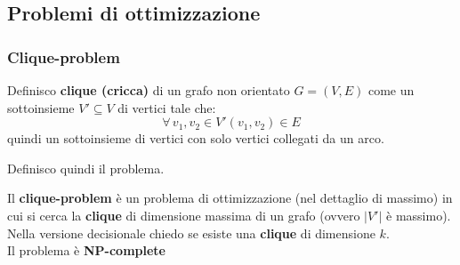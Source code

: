 																				
										\subsection{Problemi di ottimizzazione}
										\subsubsection{Clique-problem}
										\begin{definizione}
											Definisco \textbf{clique (\textup{cricca})} di un grafo non orientato
											$G=(V,E)$ come un sottoinsieme $V'\subseteq V$ di vertici tale che:
											\[\forall \,v_1,v_2\in V' (v_1,v_2)\in E\]
											quindi un sottoinsieme di vertici con solo vertici collegati da un arco.
										\end{definizione}
										Definisco quindi il problema.
										\begin{definizione}
											Il \textbf{clique-problem} è un problema di ottimizzazione (nel
											dettaglio di massimo) in cui si cerca la \textbf{clique} di dimensione massima
											di un grafo (ovvero $|V'|$ è massimo). Nella versione decisionale chiedo se
											esiste una \textbf{clique} di dimensione $k$.\\
											Il problema è \textbf{NP-complete}
										\end{definizione}
